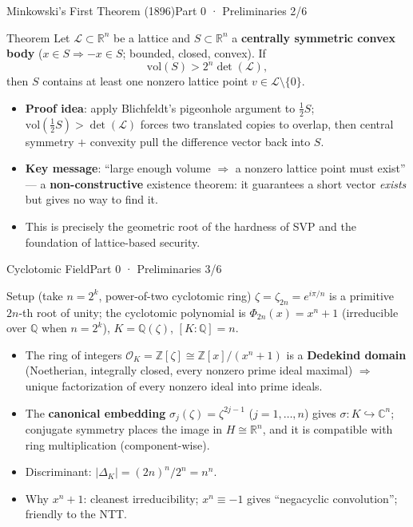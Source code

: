 \documentclass[aspectratio=169, 11pt]{beamer}
\newcommand{\R}{\mathbb{R}}
\newcommand{\Z}{\mathbb{Z}}
\newcommand{\Q}{\mathbb{Q}}
\newcommand{\OK}{\mathcal{O}_K}
\newcommand{\vol}{\mathrm{vol}}
\begin{document}
\begin{frame}{Minkowski's First Theorem (1896)}{Part 0 · Preliminaries 2/6}
  \begin{block}{Theorem}
    Let $\mathcal{L}\subset\R^n$ be a lattice and $S\subset\R^n$ a \textbf{centrally symmetric convex body}
    ($x\in S\Rightarrow -x\in S$; bounded, closed, convex). If
    \[
      \vol(S) > 2^n \det(\mathcal{L}),
    \]
    then $S$ contains at least one nonzero lattice point $v\in\mathcal{L}\setminus\{0\}$.
  \end{block}
  \begin{itemize}\small
    \item \textbf{Proof idea}: apply Blichfeldt's pigeonhole argument to $\tfrac12 S$;
      $\vol(\tfrac12 S)>\det(\mathcal{L})$ forces two translated copies to overlap, then
      central symmetry $+$ convexity pull the difference vector back into $S$.
    \item \textbf{Key message}: ``large enough volume $\Rightarrow$ a nonzero lattice point must exist'' ---
      a \textbf{non-constructive} existence theorem: it guarantees a short vector \emph{exists} but gives no way to find it.
    \item This is precisely the geometric root of the hardness of SVP and the foundation of lattice-based security.
  \end{itemize}
\end{frame}

\begin{frame}{Cyclotomic Field}{Part 0 · Preliminaries 3/6}
  \begin{block}{Setup (take $n=2^k$, power-of-two cyclotomic ring)}
    $\zeta=\zeta_{2n}=e^{i\pi/n}$ is a primitive $2n$-th root of unity; the cyclotomic polynomial is
    $\Phi_{2n}(x)=x^n+1$ (irreducible over $\Q$ when $n=2^k$),
    $K=\Q(\zeta)$, $[K:\Q]=n$.
  \end{block}
  \begin{itemize}\small
    \item The ring of integers $\OK=\Z[\zeta]\cong\Z[x]/(x^n+1)$ is a \textbf{Dedekind domain}
      (Noetherian, integrally closed, every nonzero prime ideal maximal) $\Rightarrow$ unique factorization of every nonzero ideal into prime ideals.
    \item The \textbf{canonical embedding} $\sigma_j(\zeta)=\zeta^{2j-1}$ ($j=1,\dots,n$) gives
      $\sigma:K\hookrightarrow\mathbb{C}^n$; conjugate symmetry places the image in $H\cong\R^n$,
      and it is compatible with ring multiplication (component-wise).
    \item Discriminant: $|\Delta_K|=(2n)^n/2^n=n^n$.
    \item Why $x^n+1$: cleanest irreducibility; $x^n\equiv-1$ gives ``negacyclic convolution''; friendly to the NTT.
  \end{itemize}
\end{frame}
\end{document}

